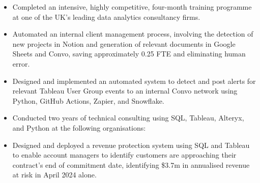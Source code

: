 \documentclass[10pt,a4paper,ragged2e,withhyper]{altacv}
\begin{document}

\makecvname



\begin{paracol}{2}

\begin{itemize}
\item Completed an intensive, highly competitive, four-month training programme at one of the UK’s leading data analytics consultancy firms.
\item Automated an internal client management process, involving the detection of new projects in Notion and generation of relevant documents in Google Sheets and Convo, saving approximately 0.25 FTE and eliminating human error.
\item Designed and implemented an automated system to detect and post alerts for relevant Tableau User Group events to an internal Convo network using Python, GitHub Actions, Zapier, and Snowflake.
\item Conducted two years of technical consulting using SQL, Tableau, Alteryx, and Python at the following organisations:

\medskip
{}

\end{itemize}

\divider

\begin{itemize}
\item Designed and deployed a revenue protection system using SQL and Tableau to enable account managers to identify customers are approaching their contract's end of commitment date, identifying \$3.7m in annualised revenue at risk in April 2024 alone.


\end{itemize}
\end{paracol}
\end{document}
